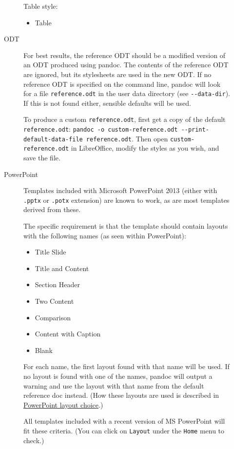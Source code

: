 \documentclass[
  a4paper,
]{article}
\providecommand{\tightlist}{%
  \setlength{\itemsep}{0pt}\setlength{\parskip}{0pt}}
\begin{document}
\begin{description}
\begin{description}
Table style:

\begin{itemize}
\tightlist
\item
  Table
\end{itemize}
\item[ODT]
For best results, the reference ODT should be a modified version of an
ODT produced using pandoc. The contents of the reference ODT are
ignored, but its stylesheets are used in the new ODT. If no reference
ODT is specified on the command line, pandoc will look for a file
\texttt{reference.odt} in the user data directory (see
\texttt{-\/-data-dir}). If this is not found either, sensible defaults
will be used.

To produce a custom \texttt{reference.odt}, first get a copy of the
default \texttt{reference.odt}:
\texttt{pandoc\ -o\ custom-reference.odt\ -\/-print-default-data-file\ reference.odt}.
Then open \texttt{custom-reference.odt} in LibreOffice, modify the
styles as you wish, and save the file.
\item[PowerPoint]
Templates included with Microsoft PowerPoint 2013 (either with
\texttt{.pptx} or \texttt{.potx} extension) are known to work, as are
most templates derived from these.

The specific requirement is that the template should contain layouts
with the following names (as seen within PowerPoint):

\begin{itemize}
\tightlist
\item
  Title Slide
\item
  Title and Content
\item
  Section Header
\item
  Two Content
\item
  Comparison
\item
  Content with Caption
\item
  Blank
\end{itemize}

For each name, the first layout found with that name will be used. If no
layout is found with one of the names, pandoc will output a warning and
use the layout with that name from the default reference doc instead.
(How these layouts are used is described in
\protect\hyperlink{powerpoint-layout-choice}{PowerPoint layout choice}.)

All templates included with a recent version of MS PowerPoint will fit
these criteria. (You can click on \texttt{Layout} under the
\texttt{Home} menu to check.)


\end{description}
\end{description}
\end{document}
